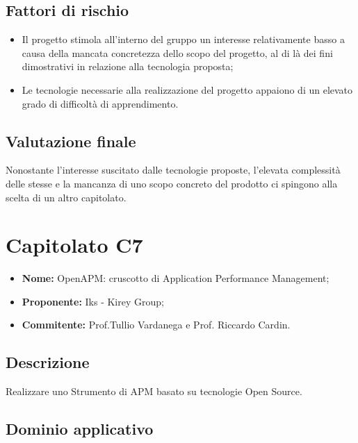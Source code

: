 \documentclass[openany,12pt,a4paper]{report}
\begin{document}
\subsection{Fattori di rischio}

\begin{itemize}
    \item Il progetto stimola all'interno del gruppo un interesse relativamente basso a causa della mancata concretezza dello scopo del progetto, al di là dei fini dimostrativi in relazione alla tecnologia proposta;
    
    \item Le tecnologie necessarie alla realizzazione del progetto appaiono di un elevato grado di difficoltà di apprendimento.
\end{itemize}

\subsection{Valutazione finale}

Nonostante l'interesse suscitato dalle tecnologie proposte, l'elevata complessità delle stesse e la mancanza di uno scopo concreto del prodotto ci spingono alla scelta di un altro capitolato.


\section{Capitolato C7}

\begin{itemize}
    \item \textbf{Nome:} OpenAPM: cruscotto di Application Performance Management;
    \item \textbf{Proponente:} Iks - Kirey Group;
    \item \textbf{Commitente:} Prof.Tullio Vardanega e Prof. Riccardo Cardin.
\end{itemize}

\subsection{Descrizione}

Realizzare uno Strumento di APM basato su tecnologie Open Source.

\subsection{Dominio applicativo}
\end{document}
